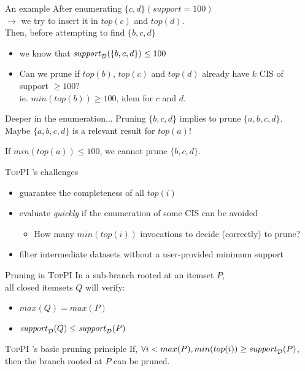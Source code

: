 \documentclass[table]{beamer}
\providecommand{\toppi}{\mbox{\textsc{TopPI}} }
\begin{document}
\begin{frame}{An example}
  After enumerating $\{c,d\} (\mathit{support}=100)$ \\
  $\rightarrow$ we try to insert it in $\mathit{top}(c)$ and $\mathit{top}(d)$.\\
  \pause
  \vspace{1em}
  Then, before attempting to find $\{b,c,d\}$
  \begin{itemize}
    \item we know that $\mathit{support}_{\cal D}(\{b,c,d\}) \leq 100$
    \item Can we prune if $\mathit{top}(b)$, $\mathit{top}(c)$ and $\mathit{top}(d)$ already have $k$ CIS of support $\geq 100$?
    \\ ie. $\mathit{min}(\mathit{top}(b)) \geq 100$, idem for $c$ and $d$.
  \end{itemize}
  \pause
  \begin{alertblock}{Deeper in the enumeration...}
    Pruning $\{b,c,d\}$ implies to prune $\{a,b,c,d\}$.\\
    Maybe $\{a,b,c,d\}$ is a relevant result for $\mathit{top}(a)$!
  \end{alertblock}
  If $\mathit{min}(\mathit{top}(a)) \leq 100$, we cannot prune $\{b,c,d\}$.
\end{frame}

\begin{frame}{\toppi's challenges}
  \begin{itemize}
    \item guarantee the completeness of all $\mathit{top}(i)$
    \pause
    \item evaluate {\em quickly} if the enumeration of some CIS can be avoided
      \begin{itemize}
        \item How many $\mathit{min}(\mathit{top}(i))$ invocations to decide (correctly) to prune?
      \end{itemize}
    \pause
    \item filter intermediate datasets without a user-provided minimum support
  \end{itemize}
\end{frame}

\begin{frame}{Pruning in \toppi}
  In a sub-branch rooted at an itemset $P$,\\
  all closed itemsets $Q$ will verify:
  \begin{itemize}
    \item $max(Q) = max(P)$
    \item $\mathit{support}_{\cal D}(Q) \leq \mathit{support}_{\cal D}(P)$
  \end{itemize}
  \begin{block}{\toppi's basic pruning principle}
    If, $\forall i < max(P), min(top(i)) \geq \mathit{support}_{\cal D}(P)$,\\
    then the branch rooted at $P$ can be pruned.
  \end{block}
\end{frame}
\end{document}
